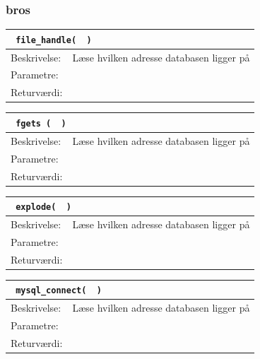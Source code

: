\subsubsection{bros}

\begin{table}[H]
\begin{tabular}{l p{12.5cm}}
\multicolumn{2}{l}{\texttt{\textcolor{blue}{} file\_handle( \textcolor{blue}{} )}} \\
\hline
Beskrivelse:&Læse hvilken adresse databasen ligger på\\
Parametre:&\\
Returværdi:&\\
\end{tabular}
\end{table}

\begin{table}[H]
\begin{tabular}{l p{12.5cm}}
\multicolumn{2}{l}{\texttt{\textcolor{blue}{} fgets ( \textcolor{blue}{} )}} \\
\hline
Beskrivelse:&Læse hvilken adresse databasen ligger på\\
Parametre:&\\
Returværdi:&\\
\end{tabular}
\end{table}

\begin{table}[H]
\begin{tabular}{l p{12.5cm}}
\multicolumn{2}{l}{\texttt{\textcolor{blue}{} explode( \textcolor{blue}{} )}} \\
\hline
Beskrivelse:&Læse hvilken adresse databasen ligger på\\
Parametre:&\\
Returværdi:&\\
\end{tabular}
\end{table}

\begin{table}[H]
\begin{tabular}{l p{12.5cm}}
\multicolumn{2}{l}{\texttt{\textcolor{blue}{} mysql\_connect( \textcolor{blue}{} )}} \\
\hline
Beskrivelse:&Læse hvilken adresse databasen ligger på\\
Parametre:&\\
Returværdi:&\\
\end{tabular}
\end{table}

